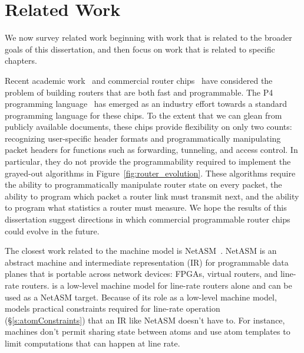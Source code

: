 \chapter{Related Work}
\label{chap:related}

We now survey related work beginning with work that is related to the broader
goals of this dissertation, and then focus on work that is related to specific
chapters.

Recent academic work~\cite{rmt} and commercial router chips~\cite{tofino,
flexpipe, xpliant} have considered the problem of building routers that are
both fast and programmable. The P4 programming language~\cite{p4} has emerged
as an industry effort towards a standard programming language for these chips.
To the extent that we can glean from publicly available documents, these chips
provide flexibility on only two counts: recognizing user-specific header
formats and programmatically manipulating packet headers for functions such as
forwarding, tunneling, and access control. In particular, they do not provide
the programmability required to implement the grayed-out algorithms in
Figure~\ref{fig:router_evolution}.  These algorithms require the ability to
programmatically manipulate router state on every packet, the ability to
program which packet a router link must transmit next, and the ability to
program what statistics a router must measure. We hope the results of this
dissertation suggest directions in which commercial programmable router
 chips could evolve in the future.

The closest work related to the \absmachine machine model is
NetASM~\cite{netasm}. NetASM is an abstract machine and intermediate
representation (IR) for programmable data planes that is portable across
network devices: FPGAs, virtual routers, and line-rate routers.  \absmachine
is a low-level machine model for line-rate routers alone and can be used as a
NetASM target. Because of its role as a low-level machine model, \absmachine
models practical constraints required for line-rate operation
(\S\ref{s:atomConstraints}) that an IR like NetASM doesn't have to. For
instance, \absmachine machines don't permit sharing state between atoms and use
atom templates to limit computations that can happen at line rate.

